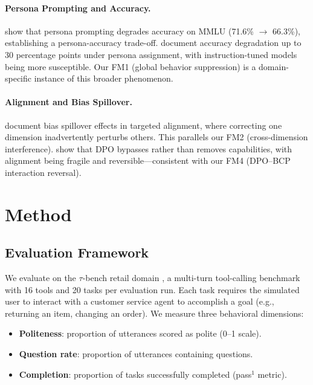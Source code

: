 \documentclass[11pt,a4paper]{article}
\newcommand{\fm}[1]{\textsc{FM#1}}
\newcommand{\bcp}{\textsc{BCP}}
\newcommand{\taubench}{$\tau$-bench}
\begin{document}
\paragraph{Persona Prompting and Accuracy.}
\citet{basil2025playing_pretend} show that persona prompting degrades accuracy on MMLU (71.6\% $\to$ 66.3\%), establishing a persona-accuracy trade-off.
\citet{hu2026expert_persona} document accuracy degradation up to 30 percentage points under persona assignment, with instruction-tuned models being more susceptible.
Our \fm{1} (global behavior suppression) is a domain-specific instance of this broader phenomenon.

\paragraph{Alignment and Bias Spillover.}
\citet{gupta2026intra_fairness} document bias spillover effects in targeted alignment, where correcting one dimension inadvertently perturbs others.
This parallels our \fm{2} (cross-dimension interference).
\citet{lee2024dpo_toxicity} show that DPO bypasses rather than removes capabilities, with alignment being fragile and reversible---consistent with our \fm{4} (DPO--\bcp{} interaction reversal).

\section{Method}
\label{sec:method}

\subsection{Evaluation Framework}

We evaluate on the \taubench{} retail domain \cite{yao2024taubench}, a multi-turn tool-calling benchmark with 16 tools and 20 tasks per evaluation run.
Each task requires the simulated user to interact with a customer service agent to accomplish a goal (e.g., returning an item, changing an order).
We measure three behavioral dimensions:
\begin{itemize}[nosep]
    \item \textbf{Politeness}: proportion of utterances scored as polite (0--1 scale).
    \item \textbf{Question rate}: proportion of utterances containing questions.
    \item \textbf{Completion}: proportion of tasks successfully completed (pass$^1$ metric).
\end{itemize}
\end{document}

